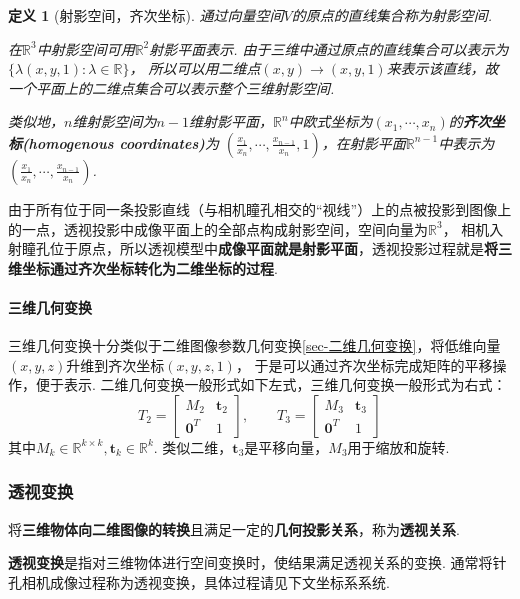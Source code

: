 \documentclass[12pt, a4paper, oneside]{ctexart}
\newtheorem{definition}{定义}
\numberwithin{equation}{section}  %
\theoremstyle{definition}
\def\bd{\boldsymbol}        %
\def\tsty{\textstyle}       %
\def\R{\mathbb{R}}          %
\begin{document}
\begin{definition}[射影空间，齐次坐标]
    通过向量空间$V$的原点的直线集合称为射影空间.
    
    在$\R^3$中射影空间可用$\R^2$射影平面表示. 由于三维中通过原点的直线集合可以表示为\\$\{\lambda(x,y,1):\lambda\in\R\}$，
    所以可以用二维点$(x,y)\to(x,y,1)$来表示该直线，故一个平面上的二维点集合可以表示整个三维射影空间.

    类似地，$n$维射影空间为$n-1$维射影平面，$\R^n$中欧式坐标为$(x_1,\cdots,x_{n})$的\textbf{齐次坐标(homogenous coordinates)}为
    $\tsty (\frac{x_1}{x_{n}},\cdots,\frac{x_{n-1}}{x_n},1)$，在射影平面$\R^{n-1}$中表示为$\tsty (\frac{x_1}{x_{n}},\cdots,\frac{x_{n-1}}{x_n})$.
\end{definition}
由于所有位于同一条投影直线（与相机瞳孔相交的“视线”）上的点被投影到图像上的一点，透视投影中成像平面上的全部点构成射影空间，空间向量为$\R^3$，
相机入射瞳孔位于原点，所以透视模型中\textbf{成像平面就是射影平面}，透视投影过程就是\textbf{将三维坐标通过齐次坐标转化为二维坐标的过程}.

\paragraph{三维几何变换}
三维几何变换十分类似于二维图像参数几何变换\ref{sec-二维几何变换}，将低维向量$(x,y,z)$升维到齐次坐标$(x,y,z,1)$，
于是可以通过齐次坐标完成矩阵的平移操作，便于表示. 
二维几何变换一般形式如下左式，三维几何变换一般形式为右式：
\begin{equation*}
    T_2 = \begin{bmatrix}
        M_2&\bd{t}_2\\
        \bd{0}^T&1
    \end{bmatrix},\qquad T_3 = \begin{bmatrix}
        M_3&\bd{t}_3\\
        \bd{0}^T&1
    \end{bmatrix}
\end{equation*}
其中$M_k\in\R^{k\times k},\bd{t}_k\in\R^k$. 类似二维，$\bd{t}_3$是平移向量，$M_3$用于缩放和旋转.

\subsubsection{透视变换}
将\textbf{三维物体向二维图像的转换}且满足一定的\textbf{几何投影关系}，称为\textbf{透视关系}.

\textbf{透视变换}是指对三维物体进行空间变换时，使结果满足透视关系的变换. 通常将针孔相机成像过程称为透视变换，具体过程请见下文坐标系系统.
\end{document}

